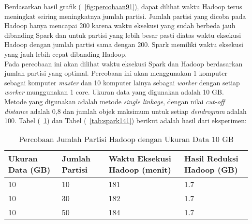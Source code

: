 Berdasarkan hasil grafik (~\ref{fig:percobaan91}), dapat dilihat waktu Hadoop terus meningkat seiring meningkatnya jumlah partisi. Jumlah partisi yang dicoba pada Hadoop hanya mencapai 200 karena waktu eksekusi yang sudah berbeda jauh dibanding Spark dan untuk partisi yang lebih besar pasti diatas waktu eksekusi Hadoop dengan jumlah partisi sama dengan 200. Spark memiliki waktu eksekusi yang jauh lebih cepat dibanding Hadoop.  \\



Pada percobaan ini akan dilihat waktu eksekusi Spark dan Hadoop berdasarkan jumlah partisi yang optimal. Percobaan ini akan menggunakan 1 komputer sebagai komputer \textit{master} dan 10 komputer lainya sebagai \textit{worker} dengan setiap \textit{worker} munggunakan 1 core. Ukuran data yang digunakan adalah 10 GB. Metode yang digunakan adalah metode \textit{single linkage}, dengan nilai \textit{cut-off distance} adalah 0,8 dan jumlah objek maksimum untuk setiap \textit{dendrogram} adalah 100. Tabel (~\ref{tab:spark131}) dan Tabel (~\ref{tab:spark141}) berikut adalah hasil dari eksperimen:





\begin{table}[H] 
	\centering 
	\caption{Percobaan Jumlah Partisi Hadoop dengan Ukuran Data 10 GB}
	\label{tab:spark131}
	\begin{tabular}{|p{3cm}|p{3cm}|p{4cm}|p{4cm}|}
\hline
Ukuran Data (GB) & Jumlah Partisi &  Waktu Eksekusi Hadoop (menit) & Hasil Reduksi Hadoop (GB)\\
\hline
10 & 10 & 181  & 1.7  \\
\hline
10 & 30 & 182  & 1.7  \\
\hline
10 & 50 & 184  & 1.7   \\
\hline


\hline

	\end{tabular} 
\end{table}




